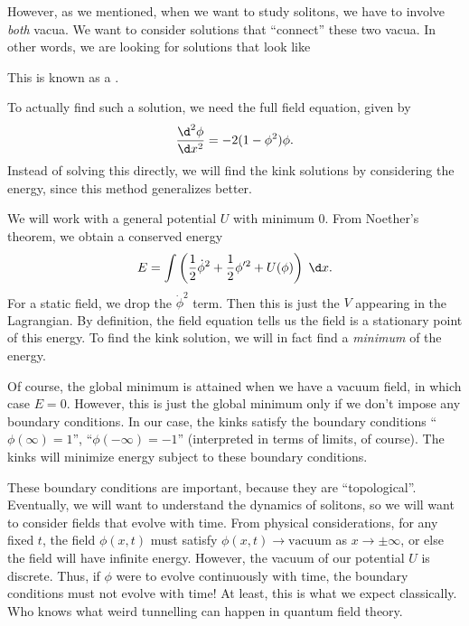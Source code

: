 \documentclass[a4paper]{article}
\begin{document}
However, as we mentioned, when we want to study solitons, we have to involve \emph{both} vacua. We want to consider solutions that ``connect'' these two vacua. In other words, we are looking for solutions that look like
\begin{center}
\end{center}
This is known as a .

To actually find such a solution, we need the full field equation, given by
\[
  \frac{\d^2 \phi}{\d x^2} = -2 (1 - \phi^2) \phi.
\]
Instead of solving this directly, we will find the kink solutions by considering the energy, since this method generalizes better.

We will work with a general potential $U$ with minimum $0$. From Noether's theorem, we obtain a conserved energy
\[
  E = \int \left(\frac{1}{2} \dot{\phi}^2 + \frac{1}{2} \phi'^2 + U(\phi)\right)\;\d x.
\]
For a static field, we drop the $\dot{\phi}^2$ term. Then this is just the $V$ appearing in the Lagrangian. By definition, the field equation tells us the field is a stationary point of this energy. To find the kink solution, we will in fact find a \emph{minimum} of the energy.

Of course, the global minimum is attained when we have a vacuum field, in which case $E = 0$. However, this is just the global minimum only if we don't impose any boundary conditions. In our case, the kinks satisfy the boundary conditions ``$\phi(\infty) = 1$'', ``$\phi(-\infty) = -1$'' (interpreted in terms of limits, of course). The kinks will minimize energy subject to these boundary conditions.

These boundary conditions are important, because they are ``topological''. Eventually, we will want to understand the dynamics of solitons, so we will want to consider fields that evolve with time. From physical considerations, for any fixed $t$, the field $\phi(x, t)$ must satisfy $\phi(x, t) \to \text{vacuum}$ as $x \to \pm \infty$, or else the field will have infinite energy. However, the vacuum of our potential $U$ is discrete. Thus, if $\phi$ were to evolve continuously with time, the boundary conditions must not evolve with time! At least, this is what we expect classically. Who knows what weird tunnelling can happen in quantum field theory.
\end{document}
